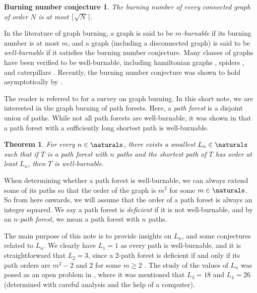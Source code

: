 \documentclass[
final
]{dmtcs-episciences}
\newtheorem{theorem}{Theorem}[section]
\newtheorem*{burning}{Burning number conjecture}
\theoremstyle{definition}
\theoremstyle{remark}
\begin{document}
\begin{burning}\citep{bonato2016how}
	The burning number of every connected graph of order $N$ is at most $\lceil\sqrt{N}\rceil$.
\end{burning}

In the literature of graph burning, a graph is said to be \emph{$m$-burnable} if its burning number is at most $m$, and a graph (including a disconnected graph) is said to be \emph{well-burnable} if it satisfies the burning number conjecture.
Many classes of graphs have been verified to be well-burnable, including hamiltonian graphs \citep{bonato2016how}, spiders \citep{bonato2019bounds, das2018burning}, and caterpillars \citep{hiller2021burning, liu2020burning}. Recently, the burning number conjecture was shown to hold asymptotically by \cite{norin2024burning}.

The reader is referred to \citet{bonato2021survey} for a survey on graph burning. In this short note, we are interested in the graph burning of path forests.
Here, a \emph{path forest} is a disjoint union of paths.
While not all path forests are well-burnable, it was shown in \citet{tan2023burnability} that a path forest with a sufficiently long shortest path is well-burnable.

\begin{theorem}\citep{tan2023burnability}\label{030922c}
	For every $n\in \naturals$, there exists a smallest $L_n\in \naturals$ such that
	if $T$ is a path forest with $n$ paths and the shortest path of $T$ has order at least $L_n$, then $T$ is well-burnable.
\end{theorem}

When determining whether a path forest is well-burnable, we can always extend some of its paths so that the order of the graph is $m^2$ for some $m\in \naturals$.
So from here onwards, we will assume that the order of a path forest is always an integer squared.
We say a path forest is \emph{deficient} if it is not well-burnable, and by an \emph{$n$-path forest}, we mean a path forest with $n$ paths.

The main purpose of this note is to provide insights on $L_n$, and some conjectures related to $L_n$.
We clearly have $L_1 = 1$ as every path is well-burnable, and it is straightforward that $L_2 = 3$, since a $2$-path forest is deficient if and only if its path orders are $m^2-2$ and $2$ for some $m\geq 2$ \citep[see][Lemma~3.1]{tan2020graph}.
The study of the values of $L_n$ was posed as an open problem in \citet{tan2023burnability}, where it was mentioned that $L_3=18$ and $L_4=26$ (determined with careful analysis and the help of a computer).
\end{document}
